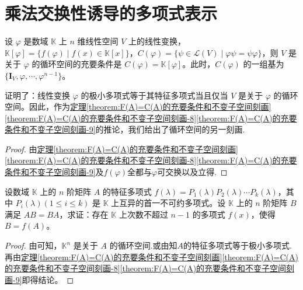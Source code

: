 \documentclass[../../main.tex]{subfiles}%
\begin{document}
\section{乘法交换性诱导的多项式表示}

\begin{theorem}\label{theorem:循环子空间的另一种刻画}
设 $\varphi$ 是数域 $\mathbb{K}$ 上 $n$ 维线性空间 $V$ 上的线性变换，$\mathbb{K}[\varphi]=\{f(\varphi)\mid f(x)\in\mathbb{K}[x]\}$，$C(\varphi)=\{\psi\in\mathcal{L}(V)\mid\varphi\psi = \psi\varphi\}$，则 $V$ 是关于 $\varphi$ 的循环空间的充要条件是 $C(\varphi)=\mathbb{K}[\varphi]$。此时，$C(\varphi)$ 的一组基为 $\{\boldsymbol{I}_V,\varphi,\cdots,\varphi^{n - 1}\}$。 
\end{theorem}
\begin{note}
证明了：线性变换 $\varphi$ 的极小多项式等于其特征多项式当且仅当 $V$ 是关于 $\varphi$ 的循环空间。因此，作为\hyperref[theorem:F(A)=C(A)的充要条件和不变子空间刻画]{定理\ref{theorem:F(A)=C(A)的充要条件和不变子空间刻画}\ref{theorem:F(A)=C(A)的充要条件和不变子空间刻画-8}\ref{theorem:F(A)=C(A)的充要条件和不变子空间刻画-9}}的推论，我们给出了循环空间的另一刻画.
\end{note}
\begin{proof}
由\hyperref[theorem:F(A)=C(A)的充要条件和不变子空间刻画]{定理\ref{theorem:F(A)=C(A)的充要条件和不变子空间刻画}\ref{theorem:F(A)=C(A)的充要条件和不变子空间刻画-8}\ref{theorem:F(A)=C(A)的充要条件和不变子空间刻画-9}}及$f(\varphi)$全都与$\varphi$可交换以及立得.
\end{proof}

\begin{example}
设数域 $\mathbb{K}$ 上的 $n$ 阶矩阵 $A$ 的特征多项式 $f(\lambda)=P_1(\lambda)P_2(\lambda)\cdots P_k(\lambda)$，其中 $P_i(\lambda) (1\leqslant  i\leqslant  k)$ 是 $\mathbb{K}$ 上互异的首一不可约多项式。设 $\mathbb{K}$ 上的 $n$ 阶矩阵 $B$ 满足 $AB = BA$，求证：存在 $\mathbb{K}$ 上次数不超过 $n - 1$ 的多项式 $f(x)$，使得 $B = f(A)$。
\end{example}
\begin{proof}
由可知，$\mathbb{K}^n$ 是关于 $A$ 的循环空间.或由知$A$的特征多项式等于极小多项式.再由\hyperref[theorem:F(A)=C(A)的充要条件和不变子空间刻画]{定理\ref{theorem:F(A)=C(A)的充要条件和不变子空间刻画}\ref{theorem:F(A)=C(A)的充要条件和不变子空间刻画-8}\ref{theorem:F(A)=C(A)的充要条件和不变子空间刻画-9}}即得结论。
\end{proof}
\end{document}
